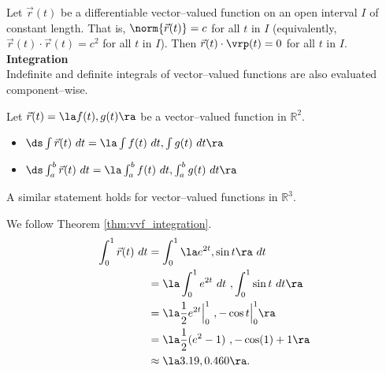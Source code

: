 {Let $\vec r(t)$ be a differentiable vector--valued function on an open interval $I$ of constant length. That is, $\norm{\vec r(t)} = c$ for all $t$ in $I$ (equivalently, $\vec r(t)\cdot \vec r(t) = c^2$ for all $t$ in $I$). 
Then $\vec r(t)\cdot\vrp(t) = 0$ for all $t$ in $I$.
}\\

\noindent\textbf{\large Integration}\\

Indefinite and definite integrals of vector--valued functions are also evaluated component--wise.

{Let $\vec r(t) = \la f(t),g(t)\ra$ be a vector--valued function in $\mathbb{R}^2$.
\begin{itemize}
	\item $\ds \int \vec r(t)\ dt = \la \int f(t)\ dt, \int g(t)\ dt\ra$
	\item	$\ds \int_a^b \vec r(t)\ dt = \la \int_a^b f(t)\ dt, \int_a^b g(t)\ dt\ra$
\end{itemize}
A similar statement holds for vector--valued functions in $\mathbb{R}^3$.
}

{We follow Theorem \ref{thm:vvf_integration}.
\begin{align*}
\int_0^1 \vec r(t) \ dt &= \int_0^1 \la e^{2t},\sin t\ra \ dt \\
				&= \la \int_0^1 e^{2t}\ dt\ , \int_0^1 \sin t \ dt \ra \\
				&= \la \frac12e^{2t}\Big|_0^1\ , -\cos t\Big|_0^1\ra \\
				&= \la \frac12(e^2-1)\ , -\cos(1)+1\ra\\
				&\approx \la 3.19,0.460\ra.
\end{align*}
\baselineskip
}\\

